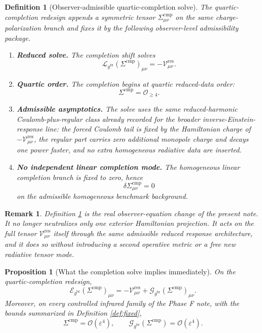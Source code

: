 \documentclass[11pt]{article}
\newcommand{\ObserverMetric}{g^{\mathrm{br}}}
\newcommand{\CompShift}{\Sigma^{\mathrm{cmp}}}
\newcommand{\EinLin}{\mathcal E_{\ObserverMetric}}
\newcommand{\GaugeBook}{\mathcal G_{\ObserverMetric}}
\newcommand{\ReducedEin}{\mathcal L_{\ObserverMetric}}
\newcommand{\ResidualCore}{\mathcal V_{\mu\nu}^{\mathrm{res}}}
\newcommand{\epsIR}{\varepsilon}
\newtheorem{definition}{Definition}
\newtheorem{proposition}{Proposition}
\newtheorem{remark}{Remark}
\begin{document}
\begin{definition}[Observer-admissible quartic-completion solve]
\label{def:solve}
The \emph{quartic-completion redesign} appends a symmetric tensor \(\CompShift_{\mu\nu}\) on the same charge-polarization branch and fixes it by the following observer-level admissibility package.
\begin{enumerate}
    \item \textbf{Reduced solve.} The completion shift solves
    \begin{equation}
    \ReducedEin(\CompShift)_{\mu\nu}
    =
    -\ResidualCore.
    \label{eq:solvedef}
    \end{equation}
    \item \textbf{Quartic order.} The completion begins at quartic reduced-data order:
    \begin{equation}
    \CompShift=\mathcal O_{\ge 4}.
    \label{eq:quarticorder}
    \end{equation}
    \item \textbf{Admissible asymptotics.} The solve uses the same reduced-harmonic Coulomb-plus-regular class already recorded for the broader inverse-Einstein-response line: the forced Coulomb tail is fixed by the Hamiltonian charge of \(-\ResidualCore\), the regular part carries zero additional monopole charge and decays one power faster, and no extra homogeneous radiative data are inserted.
    \item \textbf{No independent linear completion mode.} The homogeneous linear completion branch is fixed to zero, hence
    \begin{equation}
    \delta\CompShift_{\mu\nu}=0
    \label{eq:nolinear}
    \end{equation}
    on the admissible homogeneous benchmark background.
\end{enumerate}
\end{definition}

\begin{remark}
Definition \ref{def:solve} is the real observer-equation change of the present note. It no longer neutralizes only one exterior Hamiltonian projection. It acts on the full tensor \(\ResidualCore\) itself through the same admissible reduced response architecture, and it does so without introducing a second operative metric or a free new radiative tensor mode.
\end{remark}

\begin{proposition}[What the completion solve implies immediately]
\label{prop:solve}
On the quartic-completion redesign,
\begin{equation}
\EinLin(\CompShift)_{\mu\nu}
=
-\ResidualCore+\GaugeBook(\CompShift)_{\mu\nu}.
\label{eq:linsolve}
\end{equation}
Moreover, on every controlled infrared family of the Phase F note, with the bounds summarized in Definition \ref{def:fixed},
\begin{equation}
\CompShift=\mathcal O(\epsIR^4),
\qquad
\GaugeBook(\CompShift)=\mathcal O(\epsIR^4).
\label{eq:compIR}
\end{equation}
\end{proposition}
\end{document}
